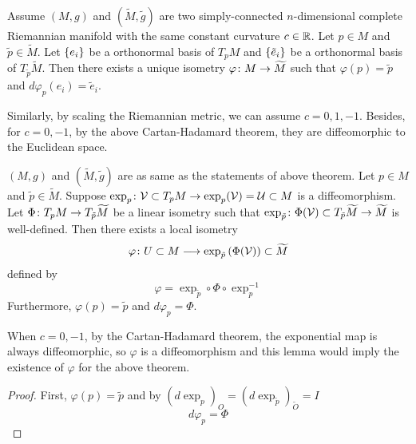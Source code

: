 \begin{enumerate}[label=\arabic{*}.]
	\begin{thm}\label{thm:spaceform}
		Assume $(M,g)$ and $(\widetilde{M},\widetilde{g})$ are two simply-connected $n$-dimensional complete Riemannian manifold with the same constant curvature $c \in \mathbb{R}$. Let $p \in M$ and $\tilde{p} \in \widetilde{M}$. Let $\left\{e_i\right\}$ be a orthonormal basis of $T_pM$ and $\left\{\tilde{e}_i\right\}$ be a orthonormal basis of $T_{\tilde{p}}\widetilde{M}$. Then there exists a unique isometry $\varphi \colon M \rightarrow \widetilde{M}$ such that $\varphi(p) = \tilde{p}$ and $d\varphi_p(e_i) = \tilde{e}_i$. 
	\end{thm}
	\begin{rmk}
		Similarly, by scaling the Riemannian metric, we can assume $c = 0,1,-1$. Besides, for $c = 0, -1$, by the above Cartan-Hadamard theorem, they are diffeomorphic to the Euclidean space.
	\end{rmk}
	\begin{lem}\label{lem:existofspform}
		$(M,g)$ and $(\widetilde{M},\widetilde{g})$ are as same as the statements of above theorem. Let $p \in M$ and $\tilde{p} \in \widetilde{M}$. Suppose $\exp_p \colon \mathcal{V} \subset T_pM \rightarrow \exp_p(\mathcal{V}) = \mathcal{U} \subset M$ is a diffeomorphism. Let $\Phi \colon T_pM \rightarrow T_{\tilde{p}}\widetilde{M}$ be a linear isometry such that ${\exp}_{\tilde{p}} \colon \Phi(\mathcal{V}) \subset T_{\tilde{p}}\widetilde{M} \rightarrow \widetilde{M}$ is well-defined. Then there exists a local isometry
		\begin{equation*}
			\varphi \colon U \subset M \longrightarrow {\exp}_{\tilde{p}}\left(\Phi(\mathcal{V})\right) \subset \widetilde{M}
		\end{equation*}
		defined by
		\begin{equation*}
			\varphi = {\exp}_{\tilde{p}} \circ \Phi \circ \exp_p^{-1}
		\end{equation*}
		Furthermore, $\varphi(p) = \tilde{p}$ and $d\varphi_p = \Phi$. 
	\end{lem}
	\begin{rmk}
		When $c=0,-1$, by the Cartan-Hadamard theorem, the exponential map is always diffeomorphic, so $\varphi$ is a diffeomorphism and this lemma would imply the existence of $\varphi$ for the above theorem.
	\end{rmk}
	\begin{proof}
		First, $\varphi(p) = \tilde{p}$ and by $(d\exp_p)_O = (d{\exp}_{\tilde{p}})_{\tilde{O}} =I$
		\begin{equation*}
			d\varphi_p = \Phi
		\end{equation*}

\end{proof}
\end{enumerate}
